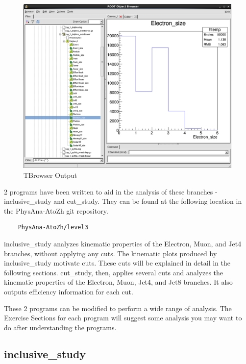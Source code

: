 \documentclass{article}
\begin{document}
\begin{figure}[!htbp]
	\centering
	\includegraphics[width = \linewidth]{tbrowser_screenshot.png}
	\caption{TBrowser Output}
	\label{fig:tbrowserOutput}
\end{figure}

\bigskip

2 programs have been written to aid in the analysis of these branches - inclusive\_study
and cut\_study. They can be found at the following location in the PhysAna-AtoZh git repository.

\begin{verbatim}
	PhysAna-AtoZh/level3
\end{verbatim}

inclusive\_study analyzes kinematic properties of the Electron, Muon, and Jet4 branches, without
applying any cuts. The kinematic plots produced by inclusive\_study motivate cuts. These cuts will
be explained in detail in the following sections. cut\_study, then, applies several cuts and analyzes
the kinematic properties of the Electron, Muon, Jet4, and Jet8 branches. It also outputs efficiency
information for each cut.

\bigskip

These 2 programs can be modified to perform a wide range of analysis. The Exercise Sections for
each program will suggest some analysis you may want to do after understanding the programs.

\subsection{inclusive\_study}
\label{sec:inclusiveStudy}
\end{document}

